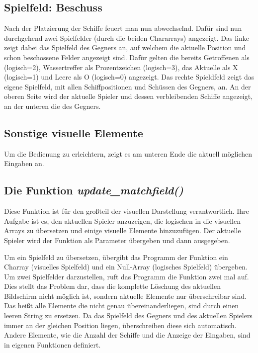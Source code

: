 \documentclass{llncs}
\begin{document}
\subsection{Spielfeld: Beschuss}

Nach der Platzierung der Schiffe feuert man nun abwechselnd. Dafür sind nun durchgehend zwei Spielfelder (durch die beiden Chararrays) angezeigt. Das linke zeigt dabei das Spielfeld des Gegners an, auf welchem die aktuelle Position und
schon beschossene Felder angezeigt sind. Dafür gelten die bereits Getroffenen als \glqq *\grqq{} (logisch=2), Wassertreffer als \glqq Prozentzeichen\grqq{} (logisch=3), das Aktuelle als \glqq X\grqq{} (logisch=1) und Leere als \glqq O\grqq{} (logisch=0)
angezeigt. Das rechte Spieldfeld zeigt das eigene Spielfeld, mit allen Schiffpositionen und Schüssen des Gegners, an. An der oberen Seite wird der aktuelle Spieler und dessen verbleibenden Schiffe angezeigt, an
der unteren die des Gegners.

\subsection{Sonstige visuelle Elemente}

Um die Bedienung zu erleichtern, zeigt es am unteren Ende die aktuell möglichen Eingaben an.

\subsection{Die Funktion \emph{update\_matchfield()}}

Diese Funktion ist für den großteil der visuellen Darstellung verantwortlich. Ihre Aufgabe ist es, den aktuellen Spieler anzuzeigen, die logischen in die visuellen Arrays zu übersetzen
und einige visuelle Elemente hinzuzufügen. Der aktuelle Spieler wird der Funktion als Parameter übergeben und dann ausgegeben.

Um ein Spielfeld zu übersetzen, übergibt das Programm der Funktion ein Charray (visuelles Spielfeld) und ein Null-Array (logisches Spielfeld) übergeben. Um zwei Spielfelder darzustellen,
ruft das Programm die Funktion zwei mal auf. Dies stellt das Problem dar, dass die komplette Löschung des aktuellen Bildschirm nicht möglich ist, sondern aktuelle Elemente nur überschreibar sind.
Das heißt alle Elemente die nicht genau übereinanderliegen, sind durch einen leeren String zu ersetzen. Da das Spielfeld des Gegners und des aktuellen Spielers
immer an der gleichen Position liegen, überschreiben diese sich automatisch. Andere Elemente, wie die Anzahl der Schiffe und die Anzeige der Eingaben, sind in eigenen Funktionen definiert.
\end{document}
